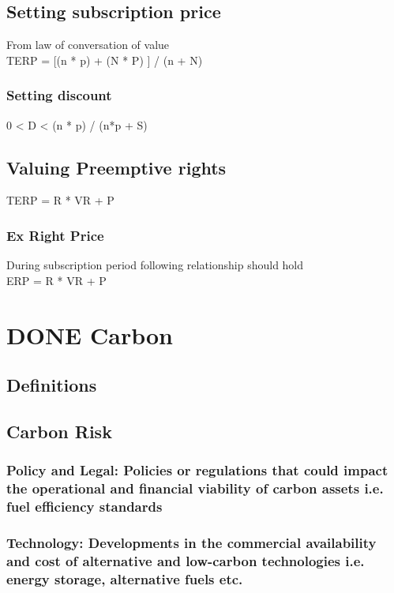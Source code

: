 \documentclass[11pt]{article}
\begin{document}
\subsection*{Setting subscription price}
\label{sec:orga8f0e42}
From law of conversation of value\\
TERP = [(n * p) + (N * P) ] / (n + N)\\
\subsubsection*{Setting discount}
\label{sec:org156263a}
0 < D < (n * p) / (n*p + S)\\
\subsection*{Valuing Preemptive rights}
\label{sec:orgea2f912}
TERP = R * VR + P\\
\subsubsection*{Ex Right Price}
\label{sec:org4a63780}
During subscription period following relationship should hold\\
ERP = R * VR + P\\
\section*{{\bfseries\sffamily DONE} Carbon}
\label{sec:org316f386}
\subsection*{Definitions}
\label{sec:org1b7e67a}
\subsection*{Carbon Risk}
\label{sec:org5c59b96}
\subsubsection*{\textbf{Policy and Legal}: Policies or regulations that could impact the operational and financial viability of carbon assets i.e. fuel efficiency standards}
\label{sec:orgf1b590c}
\subsubsection*{\textbf{Technology}: Developments in the commercial availability and cost of alternative and low-carbon technologies i.e. energy storage, alternative fuels etc.}
\label{sec:orgfbf6bd5}
\end{document}
